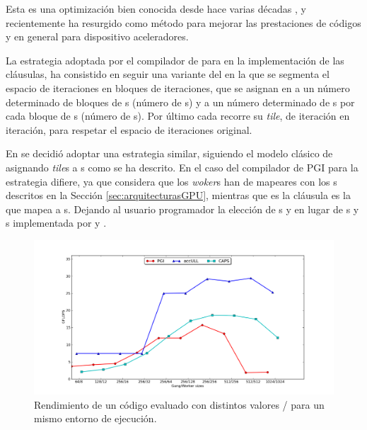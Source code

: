 Esta es una optimización bien conocida desde hace varias décadas 
\cite{Wolfe:1987:IST,Wolfe:1989:MIS},
y recientemente ha resurgido como método para mejorar las prestaciones de códigos \CUDA{} 
\cite{BON:ATC:2008} y en general para dispositivo aceleradores.


La estrategia adoptada por el compilador de \CAPS{} para \OpenACC{} en la implementación 
de las cláusulas, ha consistido en seguir una variante del \tiling{} en la que se segmenta 
el espacio de iteraciones en bloques de iteraciones, que se asignan en \gpu{} 
a un número determinado de bloques de \thread{}s (número de \gang{}s) y a un número 
determinado de \thread{}s por cada bloque de \thread{}s (número de \worker{}s).
Por último cada \thread{} recorre su \textit{tile}, de iteración en iteración, 
para respetar el espacio de iteraciones original.

En \accULL{} se decidió adoptar una estrategia similar, siguiendo el modelo clásico de 
\tiling{} asignando \textit{tile}s a \thread{}s como se ha descrito. 
En el caso del compilador de PGI para \OpenACC{} la estrategia difiere, ya que considera 
que los \textit{woker}s han de mapeares con los \warp{}s descritos en la Sección 
\ref{sec:arquitecturasGPU}, mientras que es la cláusula \cvector{} es la que mapea a 
\thread{}s. Dejando al usuario programador la elección de \gang{}s y \cvector{} en lugar 
de \gang{}s y \worker{}s implementada por \CAPS{} y \accULL{}.

\begin{figure}[h]
   \centering
   \includegraphics[width=\textwidth]{FIGURES/gemm_flops_varying}
   \caption{Rendimiento de un código evaluado con distintos valores \gang{}/\worker{} para un mismo entorno de ejecución.}
   \label{fig:gemm_gangworker_1}
\end{figure}

